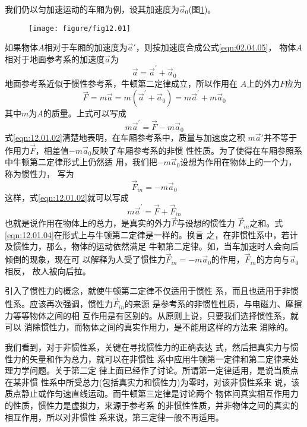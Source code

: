 \documentclass[../outline-of-mechanics.tex]{subfiles}
\begin{document}
我们仍以匀加速运动的车厢为例，设其加速度为$ \vec{a} _ { 0 } $(图\ref{fig:12.01})。
\begin{figure}[h]
  \centering
  \texttt{[image: figure/fig12.01]}
  \caption{}
  \label{fig:12.01}
\end{figure}
如果物体$ A $相对于车厢的加速度为$ \vec{a}' $，则按加速度合成公式\eqref{eqn:02.04.05}，
物体$ A $相对于地面参考系的加速度$ \vec{a} $为
\begin{equation}\label{eqn:12.01.01}
  \vec{a} = \vec{a} ^ { \prime } + \vec{a} _ { 0 }
\end{equation}
地面参考系近似于惯性参考系，牛顿第二定律成立，所以作用在
$ A $上的外力$ F $应为
\begin{equation*}
  \vec{F} = m \vec{a} = m \left( \vec{a} ^ { \prime } + \vec{a} _ { 0 } \right) = m \vec{a} ^ { \prime } + m \vec{a} _ { 0 }
\end{equation*}
其中$ m $为$ A $的质量。上式可以写成
\begin{equation}\label{eqn:12.01.02}
  m \vec{a} ^ { \prime } = \vec{F} - m \vec{a} _ { 0 }
\end{equation}
式\eqref{eqn:12.01.02}清楚地表明，在车厢参考系中，质量与加速度之积
$ m \vec{a} ' $并不等于作用力$\vec{F}$，相差值$ - m \vec{a} _ 0 $反映了车厢参考系的非惯
性性质。为了使得在车厢参照系中牛顿第二定律形式上仍然适
用，我们把$-m\vec{a}_0$设想为作用在物体上的一个力，称为惯性力，
写为
\begin{equation}\label{eqn:12.01.03}
  \vec{F} _ { in } = - m \vec{a} _ { 0 }
\end{equation}
这样，式\eqref{eqn:12.01.02}就可以写成
\begin{equation}\label{eqn:12.01.04}
  m \vec{a} ^ { \prime } = \vec{F} + \vec{F} _ {in}
\end{equation}
也就是说作用在物体上的总力，是真实的外力$\vec{F}$与设想的惯性力
$\vec{F}_{in}$之和。式\eqref{eqn:12.01.04}在形式上与牛顿第二定律是一样的。换言
之，在非惯性系中，若计及惯性力，那么，物体的运动依然满足
牛顿第二定律。如，当车加速时人会向后倾倒的现象，现在可
以解释为人受了惯性力$ \vec{F}_{in}=-m\vec{a}_0 $的作用，$\vec{F}_{in}$的方向与$\vec{a}_0$相反，
故人被向后拉。

引入了惯性力的概念，就使牛顿第二定律不仅适用于惯性
系，而且也适用于非惯性系。应该再次强调，惯性力$ \vec{F}_{in} $的来源
是参考系的非惯性性质，与电磁力、摩擦力等等物体之间的相
互作用是有区别的。从原则上说，只要我们选择惯性系，就可以
消除惯性力，而物体之间的真实作用力，是不能用这样的方法来
消除的。

我们看到，对于非惯性系，关键在寻找惯性力的正确表达
式，然后把真实力与惯性力的矢量和作为总力，就可以在非惯性
系中应用牛顿第一定律和第二定律来处理力学问题。关于第二定
律上面已经作了讨论。所谓第一定律适用，是说当质点在某非惯
性系中所受总力(包括真实力和惯性力)为零时，对该非惯性系来
说，该质点静止或作匀速直线运动。而牛顿第三定律是讨论两个
物体间真实相互作用力的性质，惯性力是虚拟力，来源于参考系
的非惯性性质，并非物体之间的真实的相互作用，所以对非惯性
系来说，第三定律一般不再适用。
\end{document}
